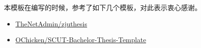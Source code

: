 
本模板在编写的时候，参考了如下几个模板，对此表示衷心感谢。

\begin{itemize}
    \item \href{https://github.com/TheNetAdmin/zjuthesis}{TheNetAdmin/zjuthesis}
    \item \href{https://github.com/OChicken/SCUT-Bachelor-Thesis-Template}{OChicken/SCUT-Bachelor-Thesis-Template}
\end{itemize}
